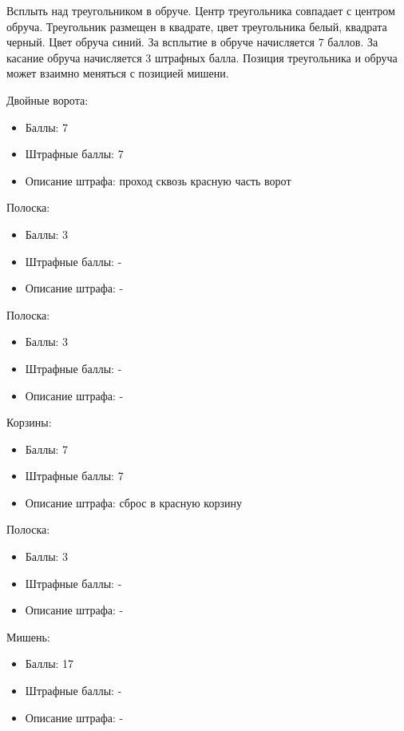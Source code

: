 
Всплыть над треугольником в обруче. Центр треугольника совпадает с центром обруча. Треугольник размещен в квадрате, цвет треугольника белый, квадрата черный. Цвет обруча синий. За всплытие в обруче начисляется 7 баллов. За касание обруча начисляется 3 штрафных балла. Позиция треугольника и обруча может взаимно меняться с позицией мишени.

\markSection

Двойные ворота: 
\begin{itemize}
    \item Баллы: 7
    \item Штрафные баллы: 7
    \item Описание штрафа: проход сквозь красную часть ворот
\end{itemize}

Полоска:
\begin{itemize}
    \item Баллы: 3
    \item Штрафные баллы: -
    \item Описание штрафа: -
\end{itemize}

Полоска: 
\begin{itemize}
    \item Баллы: 3
    \item Штрафные баллы: -
    \item Описание штрафа: -
\end{itemize}

Корзины:
\begin{itemize}
    \item Баллы: 7
    \item Штрафные баллы: 7
    \item Описание штрафа: сброс в красную корзину
\end{itemize}

Полоска:
\begin{itemize}
    \item Баллы: 3
    \item Штрафные баллы: -
    \item Описание штрафа: -
\end{itemize}

Мишень:
\begin{itemize}
    \item Баллы: 17
    \item Штрафные баллы: -
    \item Описание штрафа: -
\end{itemize}

